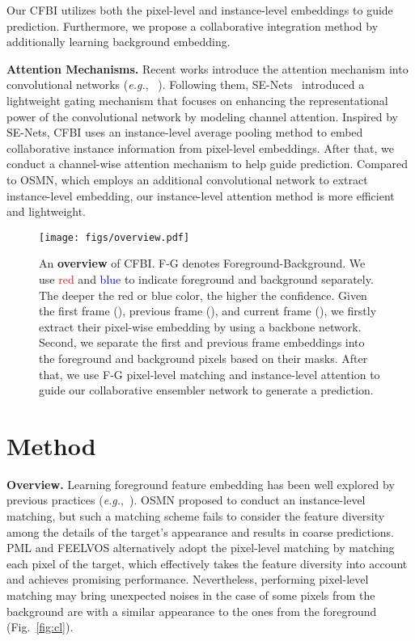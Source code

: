 \documentclass[runningheads]{llncs}
\def\eg{\emph{e.g.}}
\begin{document}
Our CFBI utilizes both the pixel-level and instance-level embeddings to guide prediction. Furthermore, we propose a collaborative integration method by additionally learning background embedding. 

\noindent\textbf{Attention Mechanisms.}
Recent works introduce the attention mechanism into convolutional networks (\eg, ~\cite{attention_conv1,attention_conv2}). 
Following them, SE-Nets~\cite{senet} introduced a lightweight gating mechanism that focuses on enhancing the representational power of the convolutional network by modeling channel attention. Inspired by SE-Nets, CFBI uses an instance-level average pooling method to embed collaborative instance information from pixel-level embeddings. After that, we conduct a channel-wise attention mechanism to help guide prediction. Compared to OSMN, which employs an additional convolutional network to extract instance-level embedding, our instance-level attention method is more efficient and lightweight.

\begin{figure}[t!]
    \centering
    \texttt{[image: figs/overview.pdf]}
    \caption{An \textbf{overview} of CFBI. F-G denotes Foreground-Background. We use \textcolor{red}{red} and \textcolor{blue}{blue} to indicate foreground and background separately. The deeper the red or blue color, the higher the confidence. Given the first frame (), previous frame (), and current frame (), we firstly extract their pixel-wise embedding by using a backbone network. Second, we separate the first and previous frame embeddings into the foreground and background pixels based on their masks. After that, we use F-G pixel-level matching and instance-level attention to guide our collaborative ensembler network to generate a prediction.}
    \label{fig:overview}

\end{figure}


\section{Method}\label{sec:model}

\noindent\textbf{Overview.} Learning foreground feature embedding has been well explored by previous practices (\eg,~\cite{osmn,feelvos}). OSMN proposed to conduct an instance-level matching, but such a matching scheme fails to consider the feature diversity among the details of the target's appearance and results in coarse predictions. PML and FEELVOS alternatively adopt the pixel-level matching by matching each pixel of the target, which effectively takes the feature diversity into account and achieves promising performance. Nevertheless, performing pixel-level matching may bring unexpected noises in the case of some pixels from the background are with a similar appearance to the ones from the foreground (Fig.~\ref{fig:cl}).
\end{document}
